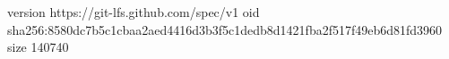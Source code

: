 version https://git-lfs.github.com/spec/v1
oid sha256:8580dc7b5c1cbaa2aed4416d3b3f5c1dedb8d1421fba2f517f49eb6d81fd3960
size 140740
